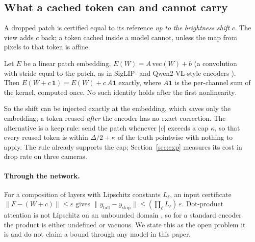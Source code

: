 \subsection{What a cached token can and cannot carry}
\label{sec:shift}

A dropped patch is certified equal to its reference \emph{up to the brightness shift $c$}. The view adds $c$ back; a token cached inside a model cannot, unless the map from pixels to that token is affine.

\begin{proposition}
\label{prop:shift}
Let $E$ be a linear patch embedding, $E(W) = A\,\mathrm{vec}(W) + b$ (a convolution with stride equal to the patch, as in SigLIP- and Qwen2-VL-style encoders \citep{wang2024qwen2vl}). Then $E(W + c\,\mathbf 1) = E(W) + c\,A\mathbf 1$ exactly, where $A\mathbf 1$ is the per-channel sum of the kernel, computed once. No such identity holds after the first nonlinearity.
\end{proposition}

So the shift can be injected exactly at the embedding, which saves only the embedding; a token reused \emph{after} the encoder has no exact correction. The alternative is a keep rule: send the patch whenever $|c|$ exceeds a cap $\kappa$, so that every reused token is within $\Delta/2 + \kappa$ of the truth pointwise with nothing to apply. The rule already supports the cap; Section~\ref{sec:exp} measures its cost in drop rate on three cameras.

\paragraph{Through the network.} For a composition of layers with Lipschitz constants $L_\ell$, an input certificate $\lVert F - (W + c) \rVert \le \varepsilon$ gives $\lVert y_{\mathrm{full}} - y_{\mathrm{skip}} \rVert \le (\prod_\ell L_\ell)\,\varepsilon$. Dot-product attention is not Lipschitz on an unbounded domain \citep{kim2021lipschitz}, so for a standard encoder the product is either undefined or vacuous. We state this as the open problem it is and do not claim a bound through any model in this paper.
